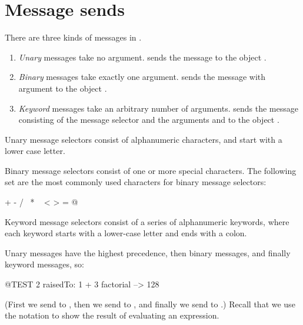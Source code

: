 \documentclass[a4paper,10pt,twoside]{book}
\begin{document}
\section{Message sends}

There are three kinds of messages in \sq.
\begin{enumerate}
  \item \emph{Unary} messages take no argument.
   sends the message  to the object .
  \item \emph{Binary} messages take exactly one argument.
  	 sends the message \ct{+} with argument  to the object .
  \item \emph{Keyword} messages take an arbitrary number of arguments.
  	 sends the message consisting of the message selector
	 and the arguments  and  to the object .
\end{enumerate}

Unary message selectors consist of alphanumeric characters, and start with a lower case letter.

Binary message selectors consist of one or more special characters. The following set are the most commonly used characters for binary message selectors:
\begin{code}{}
+ - / \ * ~ < > = @ %
\end{code}
\noindent
Keyword message selectors consist of a series of alphanumeric keywords, where each keyword starts with a lower-case letter and ends with a colon.

Unary messages have the highest precedence, then binary messages, and finally keyword messages, so:
\begin{code}{@TEST}
2 raisedTo: 1 + 3 factorial --> 128
\end{code}
(First we send  to , then we send  to , and finally we send  to .)
Recall that we use the notation \ct{-->} to show the result of evaluating an expression.
\end{document}
